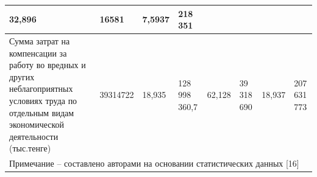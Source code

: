 \begin{longtable}[c]{|llllllll|}
  \multicolumn{1}{l|}{32,896} &
  \multicolumn{1}{l|}{16581} &
  \multicolumn{1}{l|}{7,5937} &
  218 351 \\ \hline
\multicolumn{1}{|p{0.2\textwidth}|}{Сумма затрат на компенсации за работу во вредных и других неблагоприятных условиях труда по отдельным видам экономической деятельности (тыс.тенге)} &
  \multicolumn{1}{l|}{39314722} &
  \multicolumn{1}{l|}{18,935} &
  \multicolumn{1}{p{0.08\textwidth}|}{128 998 360,7} &
  \multicolumn{1}{l|}{62,128} &
  \multicolumn{1}{p{0.08\textwidth}|}{39 318 690} &
  \multicolumn{1}{l|}{18,937} &
  \multicolumn{1}{p{0.08\textwidth}|}{207 631 773} \\ \hline
\multicolumn{8}{|l|}{Примечание – составлено авторами на основании статистических данных {[}16{]}} \\ \hline
\end{longtable}

